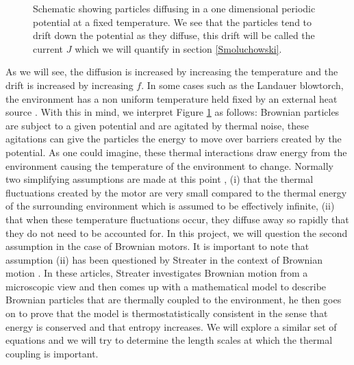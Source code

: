 \documentclass[11pt]{article} %
\begin{document}
\begin{figure}[tb]
	\centering
\quad
\caption{Schematic showing particles diffusing in a one dimensional periodic potential at a fixed temperature. We see that the particles tend to drift down the potential as they diffuse, this drift will be called the current $J$ which we will quantify in section \ref{Smoluchowski}.}
\label{fig:Schematic}
\end{figure}

As we will see, the diffusion is increased by increasing the temperature and the drift is increased by increasing $f$. In some cases such as the Landauer blowtorch, the environment has a non uniform temperature held fixed by an external heat source \cite{Landauer1988}. With this in mind, we interpret Figure \ref{fig:Schematic} as follows: Brownian particles are subject to a given potential and are agitated by thermal noise, these agitations can give the particles the energy to move over barriers created by the potential. As one could imagine, these thermal interactions draw energy from the environment causing the temperature of the environment to change. Normally two simplifying assumptions are made at this point \cite{Reimann2001}, (i) that the thermal fluctuations created by the motor are very small compared to the thermal energy of the surrounding environment which is assumed to be effectively infinite, (ii) that when these temperature fluctuations occur, they diffuse away so rapidly that they do not need to be accounted for. In this project, we will question the second assumption in the case of Brownian motors. It is important to note that assumption (ii) has been questioned by Streater in the context of Brownian motion \cite{Streater1997, Streater1997a}. In these articles, Streater investigates Brownian motion from a microscopic view and then comes up with a mathematical model to describe Brownian particles that are thermally coupled to the environment, he then goes on to prove that the model is thermostatistically consistent in the sense that energy is conserved and that entropy increases. We will explore a similar set of equations and we will try to determine the length scales at which the thermal coupling is important.
\end{document}
